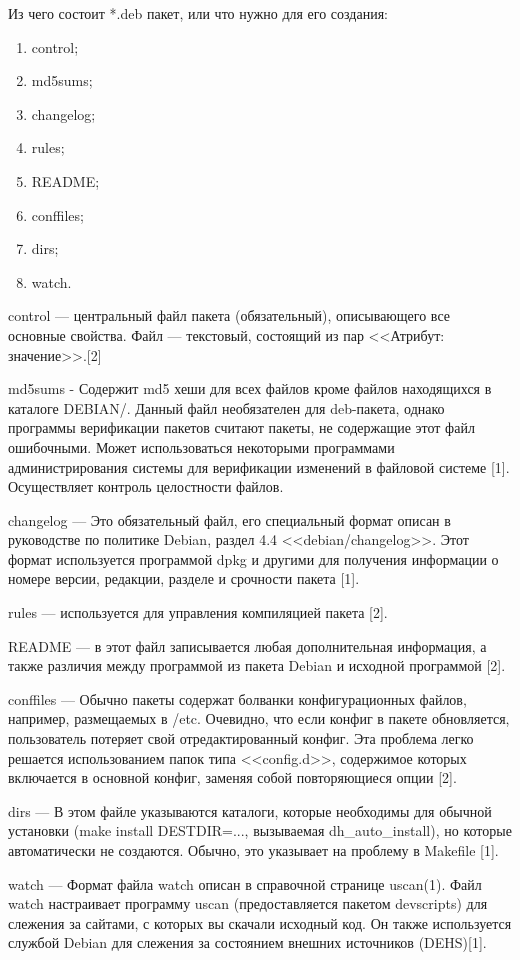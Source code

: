 Из чего состоит *.deb пакет, или что нужно для его создания:

\begin{enumerate}
\item control;
\item md5sums;
\item changelog;
\item rules;
\item README;
\item conffiles;
\item dirs;
\item watch.
\end{enumerate}

control --- центральный файл пакета (обязательный), описывающего все основные свойства. Файл --- текстовый, состоящий из пар <<Атрибут: значение>>.[2]

md5sums - Содержит md5 хеши для всех файлов кроме файлов находящихся в каталоге DEBIAN/. Данный файл необязателен для deb-пакета, 
однако программы верификации пакетов считают пакеты, не содержащие этот файл ошибочными. Может использоваться некоторыми программами администрирования системы для верификации изменений в файловой системе [1]. Осуществляет контроль целостности файлов.

changelog --- Это обязательный файл, его специальный формат описан в руководстве по политике Debian, раздел 4.4 <<debian/changelog>>. Этот формат используется программой dpkg и другими для получения информации о номере версии, редакции, разделе и срочности пакета [1].

rules --- используется для управления компиляцией пакета [2].

README --- в этот файл записывается любая дополнительная информация, а также различия между программой из пакета Debian и исходной программой [2].

conffiles --- Обычно пакеты содержат болванки конфигурационных файлов, например, размещаемых в /etc. Очевидно, что если конфиг в пакете обновляется, пользователь потеряет свой отредактированный конфиг. Эта проблема легко решается использованием папок типа <<config.d>>, содержимое которых включается в основной конфиг, заменяя собой повторяющиеся опции [2].

dirs --- В этом файле указываются каталоги, которые необходимы для обычной установки (make install DESTDIR=..., вызываемая dh\_auto\_install), но которые автоматически не создаются. Обычно, это указывает на проблему в Makefile [1].

watch --- Формат файла watch описан в справочной странице uscan(1). Файл watch настраивает программу uscan (предоставляется пакетом devscripts) для слежения за сайтами, с которых вы скачали исходный код. Он также используется службой Debian для слежения за состоянием внешних источников (DEHS)[1].


